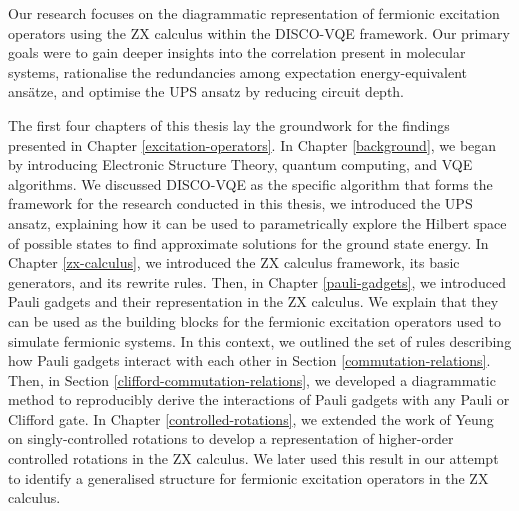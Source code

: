 
Our research focuses on the diagrammatic representation of fermionic excitation operators using the ZX calculus within the DISCO-VQE framework. Our primary goals were to gain deeper insights into the correlation present in molecular systems, rationalise the redundancies among expectation energy-equivalent ansätze, and optimise the UPS ansatz by reducing circuit depth.

The first four chapters of this thesis lay the groundwork for the findings presented in Chapter \ref{excitation-operators}. In Chapter \ref{background}, we began by introducing Electronic Structure Theory, quantum computing, and VQE algorithms. We discussed DISCO-VQE as the specific algorithm that forms the framework for the research conducted in this thesis, we introduced the UPS ansatz, explaining how it can be used to parametrically explore the Hilbert space of possible states to find approximate solutions for the ground state energy. In Chapter \ref{zx-calculus}, we introduced the ZX calculus framework, its basic generators, and its rewrite rules. Then, in Chapter \ref{pauli-gadgets}, we introduced Pauli gadgets and their representation in the ZX calculus. We explain that they can be used as the building blocks for the fermionic excitation operators used to simulate fermionic systems. In this context, we outlined the set of rules describing how Pauli gadgets interact with each other in Section \ref{commutation-relations}. Then, in Section \ref{clifford-commutation-relations}, we developed a diagrammatic method to reproducibly derive the interactions of Pauli gadgets with any Pauli or Clifford gate. In Chapter \ref{controlled-rotations}, we extended the work of Yeung \cite{Yeung2020} on singly-controlled rotations to develop a representation of higher-order controlled rotations in the ZX calculus. We later used this result in our attempt to identify a generalised structure for fermionic excitation operators in the ZX calculus.

